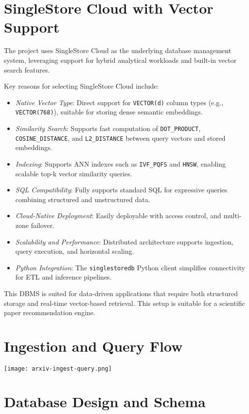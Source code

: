 \documentclass[11pt]{article}
\begin{document}
\section{SingleStore Cloud with Vector Support}
\label{sec:orge62bf38}
The project uses SingleStore Cloud as the underlying database management system, leveraging support for hybrid analytical workloads and built-in vector search features.

Key reasons for selecting SingleStore Cloud include:

\begin{itemize}
\item \emph{Native Vector Type}: Direct support for \texttt{VECTOR(d)} column types (e.g., \texttt{VECTOR(768)}), suitable for storing dense semantic embeddings.
\item \emph{Similarity Search}: Supports fast computation of \texttt{DOT\_PRODUCT}, \texttt{COSINE\_DISTANCE}, and \texttt{L2\_DISTANCE} between query vectors and stored embeddings.
\item \emph{Indexing}: Supports ANN indexes such as \texttt{IVF\_PQFS} and \texttt{HNSW}, enabling scalable top-k vector similarity queries.
\item \emph{SQL Compatibility}: Fully supports standard SQL for expressive queries combining structured and unstructured data.
\item \emph{Cloud-Native Deployment}: Easily deployable with access control, and multi-zone failover.
\item \emph{Scalability and Performance}: Distributed architecture supports ingestion, query execution, and horizontal scaling.
\item \emph{Python Integration}: The \texttt{singlestoredb} Python client simplifies connectivity for ETL and inference pipelines.
\end{itemize}

This DBMS is suited for data-driven applications that require both structured storage and real-time vector-based retrieval. This setup is suitable for a scientific paper recommendation engine.
\section{Ingestion and Query Flow}
\label{sec:org2906ddc}

\begin{center}
\texttt{[image: arxiv-ingest-query.png]}
\label{}
\end{center}
\section{Database Design and Schema}
\label{sec:org9e10c21}
\end{document}

